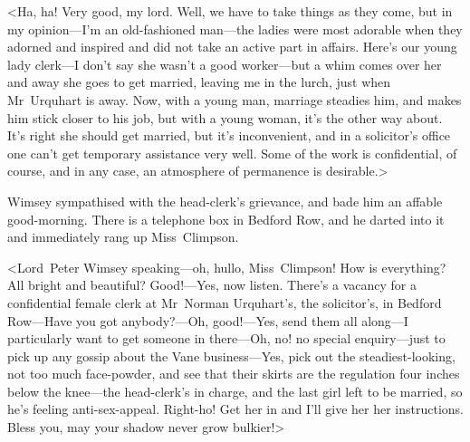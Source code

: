 <Ha, ha! Very good, my lord. Well, we have to take things as they come, but in my opinion—I'm an old-fashioned man—the ladies were most adorable when they adorned and inspired and did not take an active part in affairs. Here's our young lady clerk—I don't say she wasn't a good worker—but a whim comes over her and away she goes to get married, leaving me in the lurch, just when Mr~Urquhart is away. Now, with a young man, marriage steadies him, and makes him stick closer to his job, but with a young woman, it's the other way about. It's right she should get married, but it's inconvenient, and in a solicitor's office one can't get temporary assistance very well. Some of the work is confidential, of course, and in any case, an atmosphere of permanence is desirable.>

Wimsey sympathised with the head-clerk's grievance, and bade him an affable good-morning. There is a telephone box in Bedford Row, and he darted into it and immediately rang up Miss~Climpson.

<Lord~Peter Wimsey speaking—oh, hullo, Miss~Climpson! How is everything? All bright and beautiful? Good!—Yes, now listen. There's a vacancy for a confidential female clerk at Mr~Norman Urquhart's, the solicitor's, in Bedford Row—Have you got anybody?—Oh, good!—Yes, send them all along—I particularly want to get someone in there—Oh, no! no special enquiry—just to pick up any gossip about the Vane business—Yes, pick out the steadiest-looking, not too much face-powder, and see that their skirts are the regulation four inches below the knee—the head-clerk's in charge, and the last girl left to be married, so he's feeling anti-sex-appeal. Right-ho! Get her in and I'll give her her instructions. Bless you, may your shadow never grow bulkier!>
